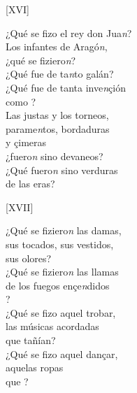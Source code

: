 \documentclass[11pt,a4paper,twoside]{article}
\begin{document}
{\begin{center}
	[XVI]
\end{center}
\pstart
¿Qué se fizo el rey don Jua\textit{n}?\\
Los infantes de Aragó\textit{n},\\
¿qué se fiziero\textit{n}?\\
¿Qué fue de ta\textit{n}to galán?\\
¿Qué fue de tanta inve\textit{n}çión\\
como ?\\
Las justas y los torneos,\\
parame\textit{n}tos, bordaduras\\
y çimeras\\
¿fuero\textit{n} sino devaneos?\\
¿Qué fuero\textit{n} sino verduras\\
de las eras?
\pend

\begin{center}
	[XVII]
\end{center}
\pstart
¿Qué se fiziero\textit{n} las damas,\\
sus tocados, sus vestidos,\\
sus olores?\\
¿Qué se fiziero\textit{n} las llamas\\
de los fuegos ençe\textit{n}didos\\
?\\
¿Qué se fizo aquel trobar,\\
las músicas acordadas\\
que tañían?\\
¿Qué se fizo aquel dançar,\\
aquelas ropas \\
que ?
\pend

}
\end{document}
